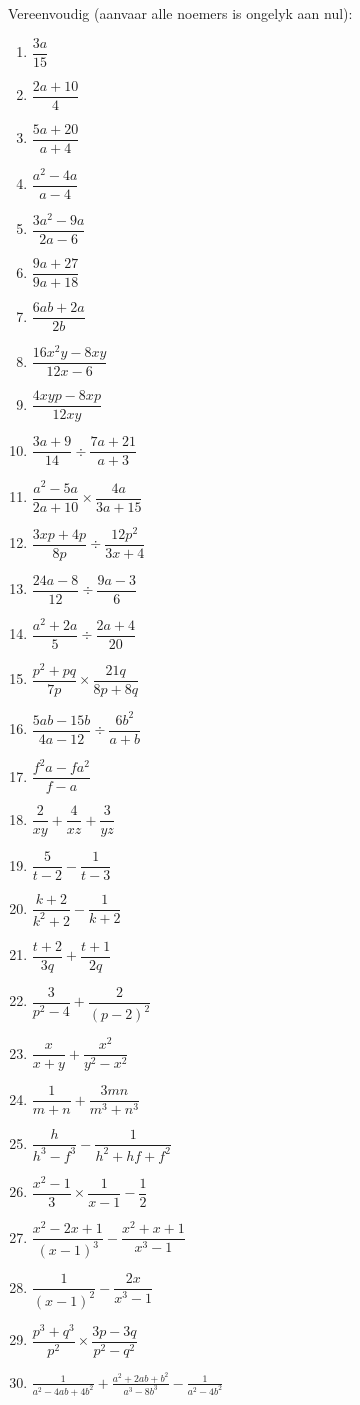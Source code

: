 \begin{exercises}{}
{

Vereenvoudig (aanvaar alle noemers is ongelyk aan nul):
\begin{multicols}{2}
\begin{enumerate}[itemsep=5pt, label=\textbf{\arabic*}. ] 
\item$\dfrac{3a}{15}$
\item $\dfrac{2a+10}{4}$
\item $\dfrac{5a+20}{a+4}$
\item $\dfrac{{a}^{2}-4a}{a-4}$
\item $\dfrac{3{a}^{2}-9a}{2a-6}$
\item $\dfrac{9a+27}{9a+18}$
\item $\dfrac{6ab+2a}{2b}$
\item $\dfrac{16{x}^{2}y-8xy}{12x-6}$
\item $\dfrac{4xyp-8xp}{12xy}$
\item $\dfrac{3a+9}{14}÷\dfrac{7a+21}{a+3}$
\item $\dfrac{{a}^{2}-5a}{2a+10} \times \dfrac{4a}{3a+15}$
\item $\dfrac{3xp+4p}{8p}÷\dfrac{12{p}^{2}}{3x+4}$
\item $\dfrac{24a-8}{12}÷\dfrac{9a-3}{6}$
\item $\dfrac{{a}^{2}+2a}{5}÷\dfrac{2a+4}{20}$
\item $\dfrac{{p}^{2}+pq}{7p} \times \dfrac{21q}{8p+8q}$
\item $\dfrac{5ab-15b}{4a-12}÷\dfrac{6{b}^{2}}{a+b}$
\item $\dfrac{{f}^{2}a-f{a}^{2}}{f-a}$
\item $\dfrac{2}{xy} + \dfrac{4}{xz}+\dfrac{3}{yz}$
\item $\dfrac{5}{t-2} - \dfrac{1}{t-3}$
\item $\dfrac{k+2}{k^{2} +2} - \dfrac{1}{k+2}$
\item $\dfrac{t+2}{3q} + \dfrac{t+1}{2q}$
\item $\dfrac{3}{p^{2}-4}+\dfrac{2}{(p-2)^{2}}$
\item $\dfrac{x}{x+y}+\dfrac{x^{2}}{y^{2} - x^{2}}$
\item $\dfrac{1}{m+n} + \dfrac{3mn}{m^{3} + n^{3}}$
\item $\dfrac{h}{h^{3}-f^{3}} - \dfrac{1}{h^{2} + hf + f^{2}}$
\item $\dfrac{{x}^{2}-1}{3}\times\dfrac{1}{x-1}-\dfrac{1}{2}$
\item $\dfrac{x^2-2x+1}{(x-1)^3} - \dfrac{x^2+x+1}{x^3-1}$
\item $\dfrac{1}{(x-1)^2} - \dfrac{2x}{x^3-1}$
\item $\dfrac{p^3 + q^3}{p^2} \times \dfrac{3p-3q}{p^2-q^2}$
\item $\frac{1}{a^2-4ab+4b^2} + \frac{a^2+2ab+b^2}{a^3-8b^3} - \frac{1}{a^2-4b^2}$
\end{enumerate}
\end{multicols}

}
\end{exercises}
